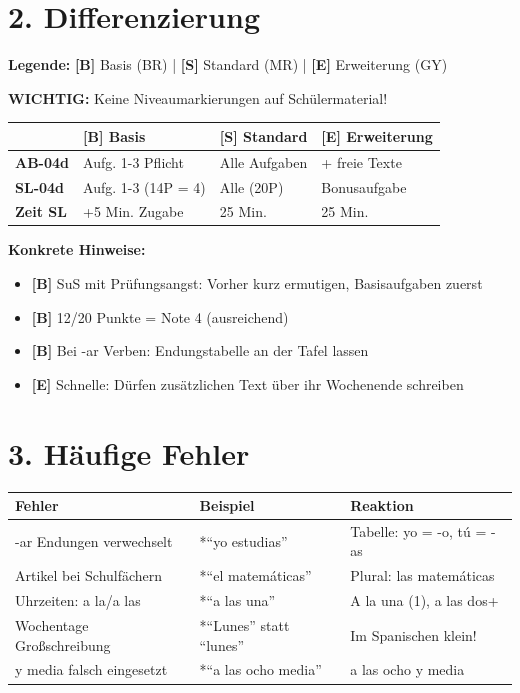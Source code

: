 \documentclass[11pt, a4paper]{article}
\newcommand{\B}{\textcolor{basis}{\textbf{[B]}}}
\newcommand{\Std}{\textcolor{standard}{\textbf{[S]}}}
\newcommand{\E}{\textcolor{erweiterung}{\textbf{[E]}}}
\begin{document}
\section*{2. Differenzierung}

\begin{differenzierung}
\textbf{Legende:} \B{} Basis (BR) | \Std{} Standard (MR) | \E{} Erweiterung (GY)

\textbf{WICHTIG:} Keine Niveaumarkierungen auf Schülermaterial!
\end{differenzierung}

\vspace{1em}

\begin{tabularx}{\textwidth}{|l|X|X|X|}
\hline
& \B{} \textbf{Basis} & \Std{} \textbf{Standard} & \E{} \textbf{Erweiterung} \\
\hline
\textbf{AB-04d} & Aufg. 1-3 Pflicht & Alle Aufgaben & + freie Texte \\
\hline
\textbf{SL-04d} & Aufg. 1-3 (14P = 4) & Alle (20P) & Bonusaufgabe \\
\hline
\textbf{Zeit SL} & +5 Min. Zugabe & 25 Min. & 25 Min. \\
\hline
\end{tabularx}

\vspace{1em}

\textbf{Konkrete Hinweise:}
\begin{itemize}
    \item \B{} SuS mit Prüfungsangst: Vorher kurz ermutigen, Basisaufgaben zuerst
    \item \B{} 12/20 Punkte = Note 4 (ausreichend)
    \item \B{} Bei -ar Verben: Endungstabelle an der Tafel lassen
    \item \E{} Schnelle: Dürfen zusätzlichen Text über ihr Wochenende schreiben
\end{itemize}

\section*{3. Häufige Fehler}

\begin{fehlerbox}
\begin{tabularx}{\textwidth}{|l|X|X|}
\hline
\textbf{Fehler} & \textbf{Beispiel} & \textbf{Reaktion} \\
\hline
-ar Endungen verwechselt & *``yo estudias'' & Tabelle: yo = -o, tú = -as \\
\hline
Artikel bei Schulfächern & *``el matemáticas'' & Plural: las matemáticas \\
\hline
Uhrzeiten: a la/a las & *``a las una'' & A la una (1), a las dos+ \\
\hline
Wochentage Großschreibung & *``Lunes'' statt ``lunes'' & Im Spanischen klein! \\
\hline
y media falsch eingesetzt & *``a las ocho media'' & a las ocho y media \\
\hline
\end{tabularx}
\end{fehlerbox}
\end{document}
